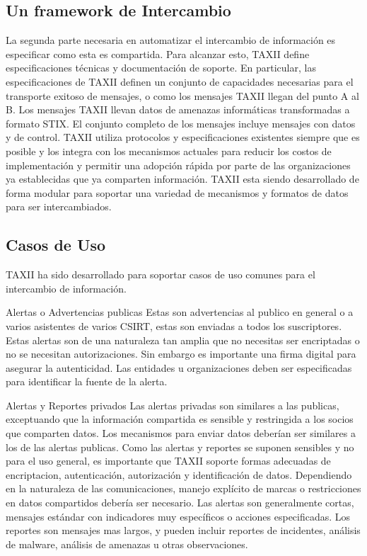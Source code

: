 \subsection{Un framework de Intercambio}
La segunda parte necesaria en automatizar el intercambio de información es 
especificar como esta es compartida. Para alcanzar esto, TAXII define 
especificaciones técnicas y documentación de soporte. En particular, las 
especificaciones de TAXII definen un conjunto de capacidades necesarias para el 
transporte exitoso de mensajes, o como los mensajes TAXII llegan del punto A al 
B. Los mensajes TAXII llevan datos de amenazas informáticas transformadas a 
formato STIX. El conjunto completo de los mensajes incluye mensajes con datos y 
de control.
TAXII utiliza protocolos y especificaciones existentes siempre que es posible y 
los integra con los mecanismos actuales para reducir los costos de 
implementación y permitir una adopción rápida por parte de las organizaciones ya 
establecidas que ya comparten información. TAXII esta siendo desarrollado de 
forma modular para soportar una variedad de mecanismos y formatos de datos para 
ser intercambiados.

\subsection{Casos de Uso}
TAXII ha sido desarrollado para soportar casos de uso comunes para el 
intercambio de información.

Alertas o Advertencias publicas
Estas son advertencias al publico en general o a varios asistentes de varios 
CSIRT, estas son enviadas a todos los suscriptores.
Estas alertas son de una naturaleza tan amplia que no necesitas ser encriptadas 
o no se necesitan autorizaciones. Sin embargo es importante una firma digital  
para asegurar la autenticidad. Las entidades u organizaciones deben ser 
especificadas para identificar la fuente de la alerta.

Alertas y Reportes privados
Las alertas privadas son similares a las publicas, exceptuando que la 
información compartida es sensible y restringida a los socios que comparten 
datos. Los mecanismos para enviar datos deberían ser similares a los de las 
alertas publicas. Como las alertas y reportes se suponen sensibles y no para el 
uso general, es importante que TAXII soporte formas adecuadas de encriptacion, 
autenticación, autorización y identificación de datos. Dependiendo en la 
naturaleza de las comunicaciones, manejo explícito de marcas o restricciones 
en datos compartidos debería ser necesario.
Las alertas son generalmente cortas, mensajes estándar con indicadores muy 
específicos o acciones especificadas.
Los reportes son mensajes mas largos, y pueden incluir reportes de incidentes, 
análisis de malware, análisis de amenazas u otras observaciones.

